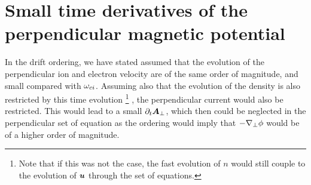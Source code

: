 \section{Small time derivatives of the perpendicular magnetic potential}
%
In the drift ordering, we have stated assumed that the evolution of the perpendicular ion and electron velocity are of the same order of magnitude, and small compared with $\omega_{ci}$.
Assuming also that the evolution of the density is also restricted by this time evolution%
%
\footnote{Note that if this was not the case, the fast evolution of $n$ would still couple to the evolution of $\boldsymbol{u}$ through the set of equations.}%
%
, the perpendicular current would also be restricted.
This would lead to a small $\partial_t \boldsymbol{A}_\perp$, which then could be neglected in the perpendicular set of equation as the ordering would imply that $-\nabla_\perp\phi$ would be of a higher order of magnitude.

